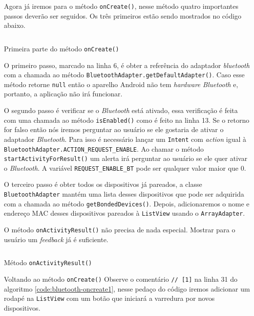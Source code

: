 \documentclass[a4paper,12pt,brazil]{book}
\begin{document}
\begin{singlespace}
	Agora já iremos para o método \texttt{onCreate()}, nesse método quatro importantes passos deverão ser seguidos. Os três primeiros estão sendo mostrados no código abaixo.

	\begin{listing}[H]
	\inputminted[linenos=true,fontsize=\small,frame=lines, framesep=2mm, tabsize=2,numbersep=5pt]{java}{src/api/bluetooth/oncreate1.java}
	\caption{Primeira parte do método \texttt{onCreate()}}
	\label{code:bluetooth-oncreate1}
	\end{listing} 			

	O primeiro passo, marcado na linha 6, é obter a referência do adaptador \emph{bluetooth} com a chamada ao método \texttt{BluetoothAdapter.getDefaultAdapter()}. Caso esse método retorne \texttt{null} então o aparelho Android não tem \emph{hardware Bluetooth} e, portanto, a aplicação não irá funcionar. 

	O segundo passo é verificar se o \emph{Bluetooth} está ativado, essa verificação é feita com uma chamada ao método \texttt{isEnabled()} como é feito na linha 13. Se o retorno for falso então nós iremos perguntar ao usuário se ele gostaria de ativar o adaptador \emph{Bluetooth}. Para isso é necessário lançar um \texttt{Intent} com \emph{action} igual à \texttt{BluetoothAdapter.ACTION\_REQUEST\_ENABLE}. Ao chamar o método \texttt{startActivityForResult()} um alerta irá perguntar ao usuário se ele quer ativar o \emph{Bluetooth}. A variável \texttt{REQUEST\_ENABLE\_BT} pode ser qualquer valor maior que 0.  

	O terceiro passo é obter todos os dispositivos já pareados, a classe \texttt{BluetoothAdapter} mantém uma lista desses dispositivos que pode ser adquirida com a chamada ao método \texttt{getBondedDevices()}. Depois, adicionaremos o nome e endereço MAC desses dispositivos pareados à \texttt{ListView} usando o \texttt{ArrayAdapter}. 

	O método \texttt{onActivityResult()} não precisa de nada especial. Mostrar para o usuário um \emph{feedback} já é suficiente.

	\begin{listing}[H]
	\inputminted[linenos=true,fontsize=\small,frame=lines, framesep=2mm, tabsize=2,numbersep=5pt]{java}{src/api/bluetooth/onactivityresult.java}
	\caption{Método \texttt{onActivityResult()}}
	\label{code:bluetooth-onactivityresult}
	\end{listing} 			

	Voltando ao método \texttt{onCreate()} Observe o comentário \texttt{// [1]} na linha 31 do algoritmo \ref{code:bluetooth-oncreate1}, nesse pedaço do código iremos adicionar um rodapé na \texttt{ListView} com um botão que iniciará a varredura por novos dispositivos.


\end{singlespace}
\end{document}
